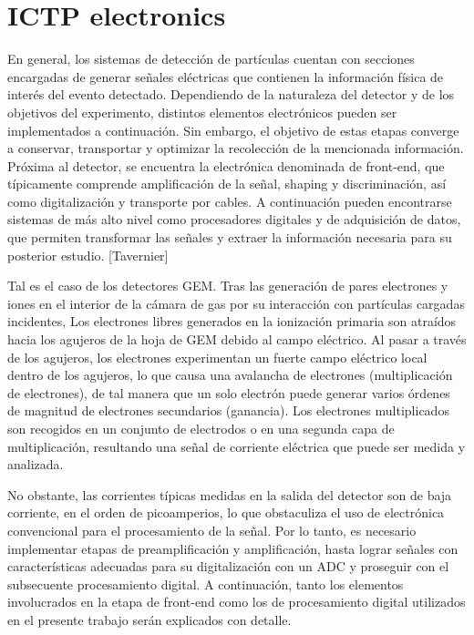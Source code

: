 \documentclass[]{book}
\begin{document}
\chapter{ICTP electronics}

\noindent En general, los sistemas de detección de partículas cuentan con secciones encargadas de generar señales eléctricas que contienen la información física de interés del evento detectado. Dependiendo de la naturaleza del detector y de los objetivos del experimento, distintos elementos electrónicos pueden ser implementados a continuación. Sin embargo, el objetivo de estas etapas converge a conservar, transportar y optimizar la recolección de la mencionada información. Próxima al detector, se encuentra la electrónica denominada de front-end, que típicamente comprende amplificación de la señal, shaping y discriminación, así como digitalización y transporte por cables. A continuación pueden encontrarse sistemas de más alto nivel como procesadores digitales y de adquisición de datos, que permiten transformar las señales y extraer la información necesaria para su posterior estudio. [Tavernier]

\noindent Tal es el caso de los detectores GEM. Tras las generación de pares electrones y iones en el interior de la cámara de gas por su interacción con partículas cargadas incidentes, Los electrones libres generados en la ionización primaria son atraídos hacia los agujeros de la hoja de GEM debido al campo eléctrico. Al pasar a través de los agujeros, los electrones experimentan un fuerte campo eléctrico local dentro de los agujeros, lo que causa una avalancha de electrones (multiplicación de electrones), de tal manera que un solo electrón puede generar varios órdenes de magnitud de electrones secundarios (ganancia). Los electrones multiplicados son recogidos en un conjunto de electrodos o en una segunda capa de multiplicación, resultando una señal de corriente eléctrica que puede ser medida y analizada.

\noindent No obstante, las corrientes típicas medidas en la salida del detector son de baja corriente, en el orden de picoamperios, lo que obstaculiza el uso de electrónica convencional para el procesamiento de la señal. Por lo tanto, es necesario implementar etapas de preamplificación y amplificación, hasta lograr señales con características adecuadas para su digitalización con un ADC y proseguir con el subsecuente procesamiento digital. A continuación, tanto los elementos involucrados en la etapa de front-end como los de procesamiento digital utilizados en el presente trabajo serán explicados con detalle.
\end{document}
